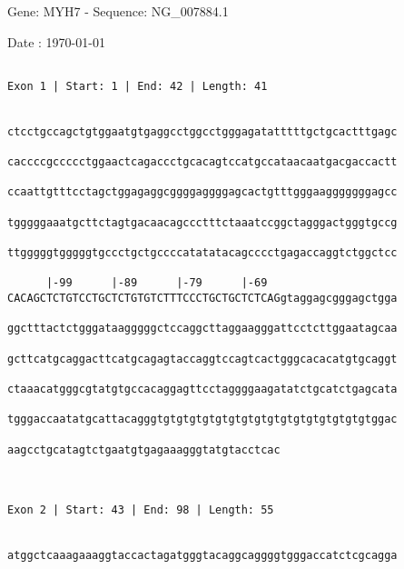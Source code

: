 \documentclass{article}
\begin{document}
\begin{center}
\begin{large}
 Gene: MYH7 - Sequence: NG\_007884.1
 
 Date : \today
\end{large}
\end{center}
 \begin{Verbatim}
 
Exon 1 | Start: 1 | End: 42 | Length: 41


ctcctgccagctgtggaatgtgaggcctggcctgggagatatttttgctgcactttgagc
                                                            
caccccgccccctggaactcagaccctgcacagtccatgccataacaatgacgaccactt
                                                            
ccaattgtttcctagctggagaggcggggaggggagcactgtttgggaagggggggagcc
                                                            
tgggggaaatgcttctagtgacaacagccctttctaaatccggctagggactgggtgccg
                                                            
ttgggggtgggggtgccctgctgccccatatatacagcccctgagaccaggtctggctcc
                                                            
      |-99      |-89      |-79      |-69                    
CACAGCTCTGTCCTGCTCTGTGTCTTTCCCTGCTGCTCTCAGgtaggagcgggagctgga
                                                            
ggctttactctgggataagggggctccaggcttaggaagggattcctcttggaatagcaa
                                                            
gcttcatgcaggacttcatgcagagtaccaggtccagtcactgggcacacatgtgcaggt
                                                            
ctaaacatgggcgtatgtgccacaggagttcctaggggaagatatctgcatctgagcata
                                                            
tgggaccaatatgcattacagggtgtgtgtgtgtgtgtgtgtgtgtgtgtgtgtgtggac
                                                            
aagcctgcatagtctgaatgtgagaaagggtatgtacctcac
                                          
                                          
 
Exon 2 | Start: 43 | End: 98 | Length: 55


atggctcaaagaaaggtaccactagatgggtacaggcaggggtgggaccatctcgcagga
                                                            

\end{Verbatim}
\end{document}

